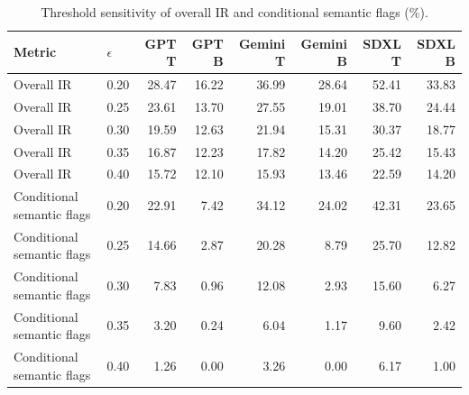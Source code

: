 \begin{table}[t]
\centering
\caption{Threshold sensitivity of overall IR and conditional semantic flags (\%).}
\label{tab:threshold-sensitivity}
\begin{tabular}{llrrrrrr}
\toprule
Metric & $\epsilon$ & GPT T & GPT B & Gemini T & Gemini B & SDXL T & SDXL B \\
\midrule
Overall IR & 0.20 & 28.47 & 16.22 & 36.99 & 28.64 & 52.41 & 33.83 \\
Overall IR & 0.25 & 23.61 & 13.70 & 27.55 & 19.01 & 38.70 & 24.44 \\
Overall IR & 0.30 & 19.59 & 12.63 & 21.94 & 15.31 & 30.37 & 18.77 \\
Overall IR & 0.35 & 16.87 & 12.23 & 17.82 & 14.20 & 25.42 & 15.43 \\
Overall IR & 0.40 & 15.72 & 12.10 & 15.93 & 13.46 & 22.59 & 14.20 \\
Conditional semantic flags & 0.20 & 22.91 & 7.42 & 34.12 & 24.02 & 42.31 & 23.65 \\
Conditional semantic flags & 0.25 & 14.66 & 2.87 & 20.28 & 8.79 & 25.70 & 12.82 \\
Conditional semantic flags & 0.30 & 7.83 & 0.96 & 12.08 & 2.93 & 15.60 & 6.27 \\
Conditional semantic flags & 0.35 & 3.20 & 0.24 & 6.04 & 1.17 & 9.60 & 2.42 \\
Conditional semantic flags & 0.40 & 1.26 & 0.00 & 3.26 & 0.00 & 6.17 & 1.00 \\
\bottomrule
\end{tabular}
\end{table}
